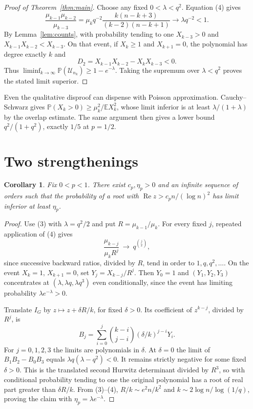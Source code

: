 \documentclass[11pt]{article}
\newtheorem{corollary}[theorem]{Corollary}
\newcommand{\E}{\mathbb E}
\newcommand{\Prob}{\mathbb P}
\newcommand{\Unst}{\mathcal U}
\newcommand{\Rea}{\operatorname{Re}}
\begin{document}
\begin{proof}[Proof of Theorem~\ref{thm:main}]
Choose any fixed $0<\lambda<q^2$. Equation (4) gives
\[
 \frac{\mu_{k-1}\mu_{k-2}}{\mu_{k-3}}
 =\mu_k q^{-2}\frac{k(n-k+3)}{(k-2)(n-k+1)}
 \longrightarrow \lambda q^{-2}<1 .
\]
By Lemma~\ref{lem:counts}, with probability tending to one $X_{k-3}>0$
and $X_{k-1}X_{k-2}<X_{k-3}$. On that event, if $X_k\ge1$ and
$X_{k+1}=0$, the polynomial has degree exactly $k$ and
\[
 D_2=X_{k-1}X_{k-2}-X_kX_{k-3}<0 .
\]
Thus $\liminf_{k\to\infty}\Prob(\Unst_{n_k})\ge 1-e^{-\lambda}$.
Taking the supremum over $\lambda<q^2$ proves the stated limit superior.
\end{proof}

Even the qualitative disproof can dispense with Poisson approximation.
Cauchy--Schwarz gives $\Prob(X_k>0)\ge \mu_k^2/\E X_k^2$, whose limit
inferior is at least $\lambda/(1+\lambda)$ by the overlap estimate.
The same argument then gives a lower bound $q^2/(1+q^2)$, exactly
$1/5$ at $p=1/2$.

\section{Two strengthenings}
\begin{corollary}\label{cor:escape}
Fix $0<p<1$. There exist $c_p,\eta_p>0$ and an infinite sequence of
orders such that the probability of a root with
$\Rea z>c_p n/(\log n)^2$ has limit inferior at least $\eta_p$.
\end{corollary}
\begin{proof}
Use (3) with $\lambda=q^2/2$ and put $R=\mu_{k-1}/\mu_k$.
For every fixed $j$, repeated application of (4) gives
\[
 \frac{\mu_{k-j}}{\mu_k R^j}\ \longrightarrow\ q^{\binom j2},
                                                               \tag{5}
\]
since successive backward ratios, divided by $R$, tend in order to
$1,q,q^2,\ldots$. On the event $X_k=1$, $X_{k+1}=0$, set
$Y_j=X_{k-j}/R^j$. Then $Y_0=1$ and $(Y_1,Y_2,Y_3)$ concentrates at
$(\lambda,\lambda q,\lambda q^3)$ even conditionally, since the event
has limiting probability $\lambda e^{-\lambda}>0$.

Translate $I_G$ by $z\mapsto z+\delta R/k$, for fixed $\delta>0$.
Its coefficient of $z^{k-j}$, divided by $R^j$, is
\[
 B_j=\sum_{i=0}^j \binom{k-i}{j-i}(\delta/k)^{j-i}Y_i .
\]
For $j=0,1,2,3$ the limits are polynomials in $\delta$. At $\delta=0$
the limit of $B_1B_2-B_0B_3$ equals $\lambda q(\lambda-q^2)<0$.
It remains strictly negative for some fixed $\delta>0$. This is the
translated second Hurwitz determinant divided by $R^3$, so with
conditional probability tending to one the original polynomial has
a root of real part greater than $\delta R/k$. From (3)--(4),
$R/k\sim e^2 n/k^2$ and $k\sim 2\log n/\log(1/q)$, proving the
claim with $\eta_p=\lambda e^{-\lambda}$.
\end{proof}
\end{document}
